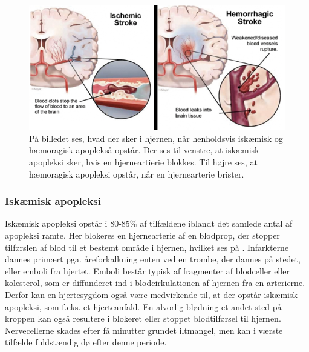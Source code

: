 \begin{figure}[H]
	\centering
	\includegraphics[scale=0.8]{figures/bProblemanalyse/haemoragisk_og_iskaemisk.png}
	\caption{På billedet ses, hvad der sker i hjernen, når henholdsvis iskæmisk og hæmoragisk apoplekså opstår. Der ses til venstre, at iskæmisk apopleksi sker, hvis en hjerneartierie blokkes. Til højre ses, at hæmoragisk apopleksi opstår, når en hjernearterie brister.\cite{Ritter2015}}
	\label{haem-isk}
\end{figure}

\subsubsection{Iskæmisk apopleksi}
Iskæmisk apopleksi opstår i 80-85\% af tilfældene iblandt det samlede antal af apopleksi ramte\cite{Sundhed.dk2014}. Her blokeres en hjernearterie af en blodprop, der stopper tilførslen af blod til et bestemt område i hjernen, hvilket ses på . Infarkterne dannes primært pga. åreforkalkning enten ved en trombe, der dannes på stedet, eller emboli fra hjertet.\cite{Schulze2011} Emboli består typisk af fragmenter af blodceller eller kolesterol, som er diffunderet ind i blodcirkulationen af hjernen fra en arterierne\cite{Academic2015a}. Derfor kan en hjertesygdom også være medvirkende til, at der opstår iskæmisk apopleksi, som f.eks. et hjerteanfald. En alvorlig blødning et andet sted på kroppen kan også resultere i blokeret eller stoppet blodtilførsel til hjernen.\cite{Hjernesagen2015a} Nervecellerne skades efter få minutter grundet iltmangel, men kan i værste tilfælde fuldstændig dø efter denne periode\cite{Schulze2011}\cite{Giraldo2015}.%

